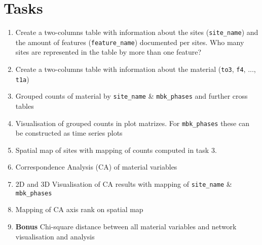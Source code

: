 \documentclass[a3, ruledsections, 8pt]{sciposter}
\begin{document}
\pagebreak

\section{Tasks}

\begin{enumerate}
\item Create a two-columns table with information about the sites (\verb|site_name|) and the amount of features (\verb|feature_name|) documented per sites. Who many sites are represented in the table by more than one feature? 
\item Create a two-columns table with information about the material  (\verb|to3|, \verb|f4|, ..., \verb|t1a|)
\item Grouped counts of material by \verb|site_name| \& \verb|mbk_phases| and further cross tables
\item Visualisation of grouped counts in plot matrizes. For \verb|mbk_phases| these can be constructed as time series plots
\item Spatial map of sites with mapping of counts computed in task 3.
\item Correspondence Analysis (CA) of material variables
\item 2D and 3D Visualisation of CA results with mapping of \verb|site_name| \& \verb|mbk_phases|
\item Mapping of CA axis rank on spatial map
\item \textbf{Bonus} Chi-square distance between all material variables and network visualisation and analysis
\end{enumerate}



%
%
%
%
%
%
%

\end{document}
